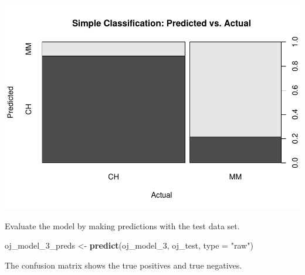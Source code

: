 \documentclass[
]{book}
\newenvironment{Shaded}{\begin{snugshade}}{\end{snugshade}}
\newcommand{\DataTypeTok}[1]{\textcolor[rgb]{0.13,0.29,0.53}{#1}}
\newcommand{\DecValTok}[1]{\textcolor[rgb]{0.00,0.00,0.81}{#1}}
\newcommand{\KeywordTok}[1]{\textcolor[rgb]{0.13,0.29,0.53}{\textbf{#1}}}
\newcommand{\NormalTok}[1]{#1}
\newcommand{\OperatorTok}[1]{\textcolor[rgb]{0.81,0.36,0.00}{\textbf{#1}}}
\newcommand{\StringTok}[1]{\textcolor[rgb]{0.31,0.60,0.02}{#1}}
\begin{document}
\includegraphics{data-sci_files/figure-latex/unnamed-chunk-56-1.pdf}

Evaluate the model by making predictions with the test data set.

\begin{Shaded}
\begin{Highlighting}[]
\NormalTok{oj_model_}\DecValTok{3}\NormalTok{_preds <-}\StringTok{ }\KeywordTok{predict}\NormalTok{(oj_model_}\DecValTok{3}\NormalTok{, oj_test, }\DataTypeTok{type =} \StringTok{"raw"}\NormalTok{)}
\end{Highlighting}
\end{Shaded}

The confusion matrix shows the true positives and true negatives.

\begin{Shaded}
\end{Shaded}
\end{document}
